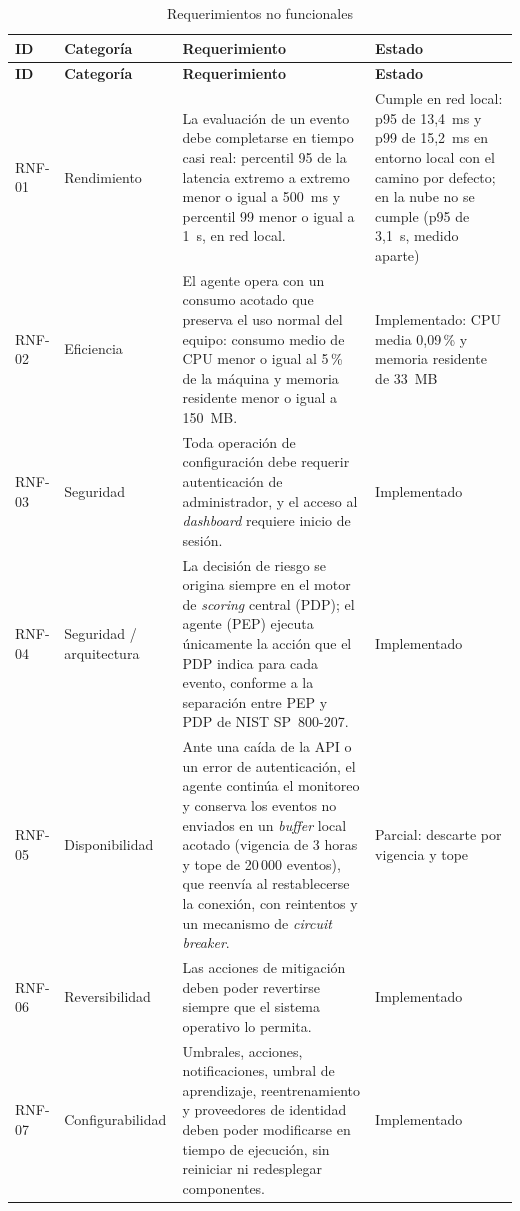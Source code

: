 \begin{tablacompacta}
\begin{longtable}{P{1.3cm}P{2.4cm}P{8.0cm}P{2.9cm}}
	\caption{Requerimientos no funcionales}
	\label{tab:rnf}\\
	\hline
	\textbf{ID} & \textbf{Categoría} & \textbf{Requerimiento} & \textbf{Estado} \\
	\hline
	\endfirsthead
	\hline
	\textbf{ID} & \textbf{Categoría} & \textbf{Requerimiento} & \textbf{Estado} \\
	\hline
	\endhead
	RNF-01 & Rendimiento & La evaluación de un evento debe completarse en tiempo casi real: percentil 95 de la latencia extremo a extremo menor o igual a 500~ms y percentil 99 menor o igual a 1~s, en red local. & Cumple en red local: p95 de 13,4~ms y p99 de 15,2~ms en entorno local con el camino por defecto; en la nube no se cumple (p95 de 3,1~s, medido aparte) \\
	\hline
	RNF-02 & Eficiencia & El agente opera con un consumo acotado que preserva el uso normal del equipo: consumo medio de CPU menor o igual al 5\,\% de la máquina y memoria residente menor o igual a 150~MB. & Implementado: CPU media 0,09\,\% y memoria residente de 33~MB \\
	\hline
	RNF-03 & Seguridad & Toda operación de configuración debe requerir autenticación de administrador, y el acceso al \emph{dashboard} requiere inicio de sesión. & Implementado \\
	\hline
	RNF-04 & Seguridad / arquitectura & La decisión de riesgo se origina siempre en el motor de \emph{scoring} central (PDP); el agente (PEP) ejecuta únicamente la acción que el PDP indica para cada evento, conforme a la separación entre PEP y PDP de NIST SP~800-207. & Implementado \\
	\hline
	RNF-05 & Disponibilidad & Ante una caída de la API o un error de autenticación, el agente continúa el monitoreo y conserva los eventos no enviados en un \emph{buffer} local acotado (vigencia de 3 horas y tope de 20\,000 eventos), que reenvía al restablecerse la conexión, con reintentos y un mecanismo de \emph{circuit breaker}. & Parcial: descarte por vigencia y tope \\
	\hline
	RNF-06 & Reversibilidad & Las acciones de mitigación deben poder revertirse siempre que el sistema operativo lo permita. & Implementado \\
	\hline
	RNF-07 & Configurabilidad & Umbrales, acciones, notificaciones, umbral de aprendizaje, reentrenamiento y proveedores de identidad deben poder modificarse en tiempo de ejecución, sin reiniciar ni redesplegar componentes. & Implementado \\

\end{longtable}
\end{tablacompacta}
